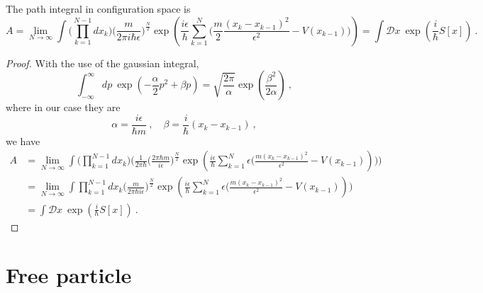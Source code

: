     The path integral in configuration space is 
    \begin{equation*}
        A = \lim_{N \rightarrow \infty} \int \Big (\prod_{k=1}^{N-1} d x_k \Big ) \Big (\frac{m}{2 \pi i \hbar \epsilon} \Big )^{\frac{N}{2}} \exp(\frac{i \epsilon}{\hbar} \sum_{k=1}^{N} \Big (\frac{m}{2} \frac{(x_k - x_{k-1})^2}{\epsilon^2} - V(x_{k-1})\Big )) = \int \mathcal D x ~ \exp(\frac{i}{\hbar} S[x]) ~.
    \end{equation*}
    \begin{proof}
        With the use of the gaussian integral, 
        \begin{equation*}
            \int_{- \infty}^\infty dp ~ \exp(- \frac{\alpha}{2} p^2 + \beta p) = \sqrt{\frac{2\pi}{\alpha}} \exp(\frac{\beta^2}{2\alpha}) ~,
        \end{equation*}
        where in our case they are 
        \begin{equation*}
            \alpha = \frac{i\epsilon}{\hbar m} ~, \quad \beta = \frac{i}{\hbar} (x_k - x_{k-1}) ~,
        \end{equation*}
        we have 
        \begin{equation*}
        \begin{aligned}
            A & = \lim_{N \rightarrow \infty} \int \Big (\prod_{k=1}^{N-1} d x_k \Big ) \Big (\frac{1}{2\pi\hbar} \Big (\frac{2\pi \hbar m}{i \epsilon} \Big)^{\frac{N}{2}}  \exp(\frac{i \epsilon}{\hbar} \sum_{k=1}^{N} \epsilon \Big (\frac{m (x_k - x_{k-1})^2}{\epsilon^2} - V(x_{k-1})) \Big ) \Big ) \\ & = \lim_{N \rightarrow \infty} \int \prod_{k=1}^{N-1} d x_k \Big (\frac{m}{2 \pi \hbar i \epsilon} \Big)^{\frac{N}{2}}  \exp(\frac{i \epsilon}{\hbar} \sum_{k=1}^{N} \epsilon \Big (\frac{m (x_k - x_{k-1})^2}{\epsilon^2} - V(x_{k-1})) \Big ) \\ & = \int \mathcal D x ~ \exp(\frac{i}{\hbar} S[x]) ~.
        \end{aligned}
        \end{equation*}
    \end{proof}

\chapter{Free particle}

